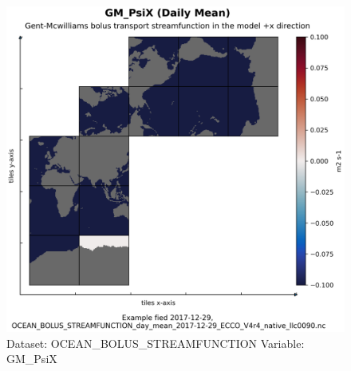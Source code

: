 \begin{figure}[H]
\centering
\includegraphics[width=\textwidth]{../images/plots/native_plots/Gent-McWilliams_Bolus_Transport_Streamfunction/GM_PsiX.png}
\caption{Dataset: OCEAN\_BOLUS\_STREAMFUNCTION Variable: GM\_PsiX}
\label{tab:table-OCEAN_BOLUS_STREAMFUNCTION_GM_PsiX-Plot}
\end{figure}
\pagebreak
